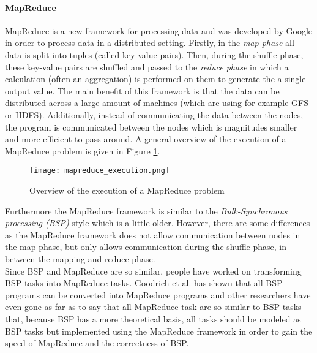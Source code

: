 \paragraph{MapReduce}
MapReduce is a new framework for processing data and was developed by Google\cite{Dean04} in order to process data in a distributed setting. Firstly, in the \textit{map phase} all data is split into tuples (called key-value pairs). Then, during the shuffle phase, these key-value pairs are shuffled and passed to the \textit{reduce phase} in which a calculation (often an aggregation) is performed on them to generate the a single output value. The main benefit of this framework is that the data can be distributed across a large amount of machines (which are using for example GFS or HDFS). Additionally, instead of communicating the data between the nodes, the program is communicated between the nodes which is magnitudes smaller and more efficient to pass around. A general overview of the execution of a MapReduce problem is given in Figure \ref{mapreduce_execution}.

\begin{figure}
	\texttt{[image: mapreduce\_execution.png]}
	\caption{Overview of the execution of a MapReduce problem\cite{Dean04}}
	\label{mapreduce_execution}
\end{figure}

Furthermore the MapReduce framework is similar to the \textit{Bulk-Synchronous processing (BSP)} style which is a little older. However, there are some differences as the MapReduce framework does not allow communication between nodes in the map phase, but only allows communication during the shuffle phase, in-between the mapping and reduce phase\cite{Pace12}.\\
Since BSP and MapReduce are so similar, people have worked on transforming BSP tasks into MapReduce tasks. Goodrich et al.\cite{Goo11} has shown that all BSP programs can be converted into MapReduce programs and other researchers have even gone as far as to say that all MapReduce task are so similar to BSP tasks that, because BSP has a more theoretical basis, all tasks should be modeled as BSP tasks but implemented using the MapReduce framework in order to gain the speed of MapReduce and the correctness of BSP\cite{Pace12}.


